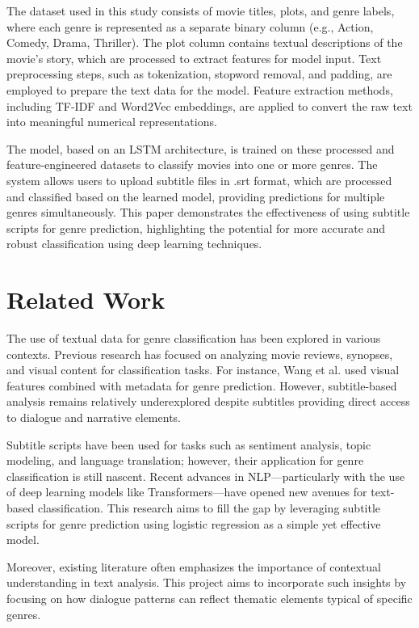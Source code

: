 \documentclass[conference]{IEEEtran}
\begin{document}
The dataset used in this study consists of movie titles, plots, and genre labels, where each genre is represented as a separate binary column (e.g., Action, Comedy, Drama, Thriller). The plot column contains textual descriptions of the movie’s story, which are processed to extract features for model input. Text preprocessing steps, such as tokenization, stopword removal, and padding, are employed to prepare the text data for the model. Feature extraction methods, including TF-IDF and Word2Vec embeddings, are applied to convert the raw text into meaningful numerical representations.

The model, based on an LSTM architecture, is trained on these processed and feature-engineered datasets to classify movies into one or more genres. The system allows users to upload subtitle files in .srt format, which are processed and classified based on the learned model, providing predictions for multiple genres simultaneously. This paper demonstrates the effectiveness of using subtitle scripts for genre prediction, highlighting the potential for more accurate and robust classification using deep learning techniques.

\section{Related Work}
The use of textual data for genre classification has been explored in various contexts. Previous research has focused on analyzing movie reviews, synopses, and visual content for classification tasks. For instance, Wang et al. used visual features combined with metadata for genre prediction. However, subtitle-based analysis remains relatively underexplored despite subtitles providing direct access to dialogue and narrative elements.

Subtitle scripts have been used for tasks such as sentiment analysis, topic modeling, and language translation; however, their application for genre classification is still nascent. Recent advances in NLP—particularly with the use of deep learning models like Transformers—have opened new avenues for text-based classification. This research aims to fill the gap by leveraging subtitle scripts for genre prediction using logistic regression as a simple yet effective model.

Moreover, existing literature often emphasizes the importance of contextual understanding in text analysis. This project aims to incorporate such insights by focusing on how dialogue patterns can reflect thematic elements typical of specific genres.
\end{document}
